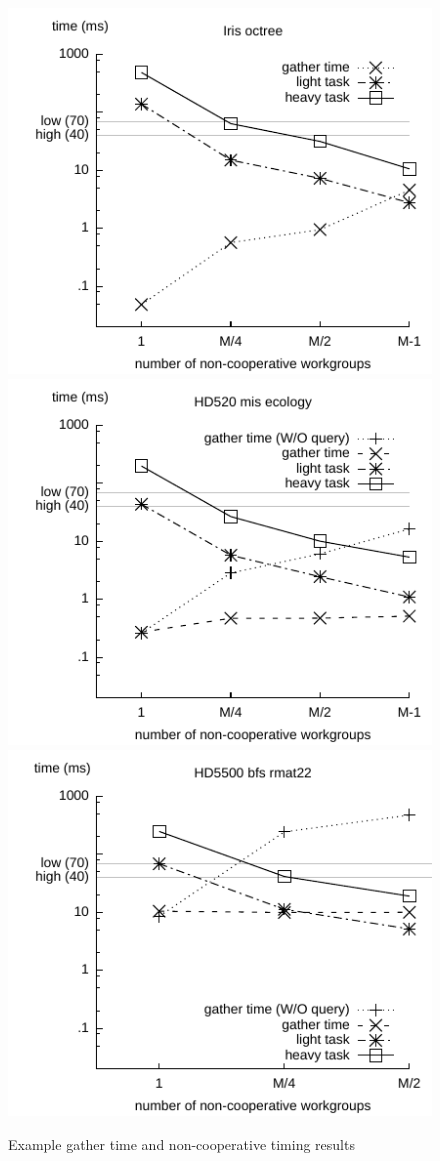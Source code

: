 \documentclass[numbers,nocopyrightspace,10pt]{sigplanconf}
\begin{document}
\begin{figure}
\includegraphics[width=.7\columnwidth]{iris_octree_NA.pdf} 
\includegraphics[width=.7\columnwidth]{hd520_mis_ecology.pdf}
\includegraphics[width=.7\columnwidth]{hd5500_bfs_rmat22.pdf}
\caption{Example gather time and non-cooperative timing results}\label{fig:fine-grained-timing}
\end{figure}
\end{document}
